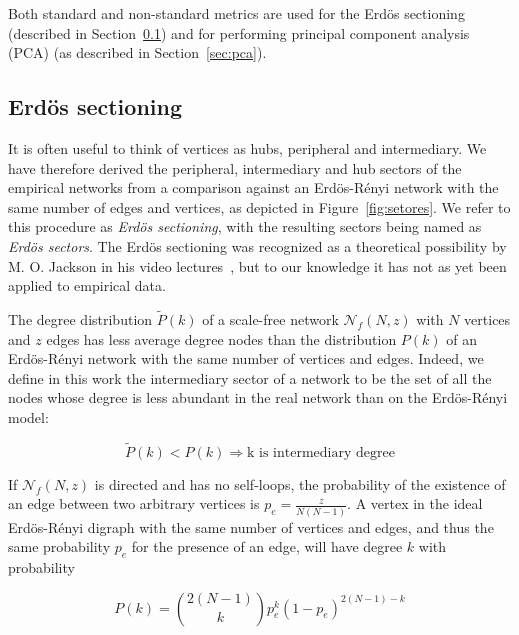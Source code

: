 \documentclass[%
	aip,
	jmp,%
	amsmath,amssymb,
	reprint,%
]{revtex4-1}
\begin{document}
Both standard and non-standard metrics are used for the Erd\"os sectioning (described in Section~\ref{sectioning}) and for performing principal component analysis (PCA) (as described in Section~\ref{sec:pca}).


\subsection{Erd\"os sectioning}\label{sectioning}
It is often useful to think of vertices as hubs, peripheral and intermediary. We have therefore derived the peripheral, intermediary and hub sectors of the empirical networks from a comparison against an Erd\"os-R\'enyi network with the same number of edges and vertices,
as depicted in Figure~\ref{fig:setores}. We refer to this procedure as \emph{Erd\"os sectioning}, with the resulting sectors being named as \emph{Erd\"os sectors}. The Erd\"os sectioning was recognized as a theoretical possibility by M. O. Jackson in his video lectures~\cite{3setores}, but to our knowledge it has not as yet been applied to empirical data.

The degree distribution $\widetilde{P}(k)$ of a scale-free network $\mathcal{N}_f(N,z)$ with $N$ vertices and $z$ edges has less
average degree nodes than the distribution $P(k)$ of an Erd\"os-R\'enyi
network with the same number of vertices and edges. Indeed, we define in this work the intermediary sector of a network to be the set of all the nodes whose degree is less abundant in the real network than on the Erd\"os-R\'enyi model:

\begin{equation}\label{criterio}
	\widetilde{P}(k)<P(k) \Rightarrow \text{k is intermediary degree}
\end{equation}

If $\mathcal{N}_f(N,z)$ is directed and has no self-loops, the probability of the existence
of an edge between two arbitrary vertices is $p_e=\frac{z}{N(N-1)}$.
A vertex in the ideal Erd\"os-R\'enyi digraph with the same number of vertices and edges, and thus the same probability $p_e$ for the presence of an edge, will have degree $k$ with probability

\begin{equation}
	P(k)=\binom{2(N-1)}{k}p_e^k(1-p_e)^{2(N-1)-k}
\end{equation}
\end{document}
